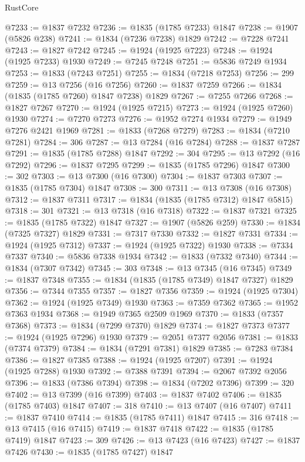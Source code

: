 \begin{lexlean}{RustCore}
\begin{coremodule}
@7233 := @1837 @7232
@7236 := @1835 (@1785 @7233) @1847
@7238 := @1907 (@5826 @238)
@7241 := @1834 (@7236 @7238) @1829
@7242 := @7228 @7241
@7243 := @1827 @7242
@7245 := @1924 (@1925 @7223)
@7248 := @1924 (@1925 @7233) @1930
@7249 := @7245 @7248
@7251 := @5836 @7249 @1934
@7253 := @1833 (@7243 @7251)
@7255 := @1834 (@7218 @7253)
@7256 := 299
@7259 := @13 @7256 (@16 @7256)
@7260 := @1837 @7259
@7266 := @1834 (@1835 (@1785 @7260) @1847 @7238) @1829
@7267 := @7255 @7266
@7268 := @1827 @7267
@7270 := @1924 (@1925 @7215)
@7273 := @1924 (@1925 @7260) @1930
@7274 := @7270 @7273
@7276 := @1952 @7274 @1934
@7279 := @1949 @7276 @2421 @1969
@7281 := @1833 (@7268 @7279)
@7283 := @1834 (@7210 @7281)
@7284 := 306
@7287 := @13 @7284 (@16 @7284)
@7288 := @1837 @7287
@7291 := @1835 (@1785 @7288) @1847
@7292 := 304
@7295 := @13 @7292 (@16 @7292)
@7296 := @1837 @7295
@7299 := @1835 (@1785 @7296) @1847
@7300 := 302
@7303 := @13 @7300 (@16 @7300)
@7304 := @1837 @7303
@7307 := @1835 (@1785 @7304) @1847
@7308 := 300
@7311 := @13 @7308 (@16 @7308)
@7312 := @1837 @7311
@7317 := @1834 (@1835 (@1785 @7312) @1847 @5815)
@7318 := 301
@7321 := @13 @7318 (@16 @7318)
@7322 := @1837 @7321
@7325 := @1835 (@1785 @7322) @1847
@7327 := @1907 (@5826 @259)
@7330 := @1834 (@7325 @7327) @1829
@7331 := @7317 @7330
@7332 := @1827 @7331
@7334 := @1924 (@1925 @7312)
@7337 := @1924 (@1925 @7322) @1930
@7338 := @7334 @7337
@7340 := @5836 @7338 @1934
@7342 := @1833 (@7332 @7340)
@7344 := @1834 (@7307 @7342)
@7345 := 303
@7348 := @13 @7345 (@16 @7345)
@7349 := @1837 @7348
@7355 := @1834 (@1835 (@1785 @7349) @1847 @7327) @1829
@7356 := @7344 @7355
@7357 := @1827 @7356
@7359 := @1924 (@1925 @7304)
@7362 := @1924 (@1925 @7349) @1930
@7363 := @7359 @7362
@7365 := @1952 @7363 @1934
@7368 := @1949 @7365 @2509 @1969
@7370 := @1833 (@7357 @7368)
@7373 := @1834 (@7299 @7370) @1829
@7374 := @1827 @7373
@7377 := @1924 (@1925 @7296) @1930
@7379 := @2051 @7377 @2056
@7381 := @1833 (@7374 @7379)
@7384 := @1834 (@7291 @7381) @1829
@7385 := @7283 @7384
@7386 := @1827 @7385
@7388 := @1924 (@1925 @7207)
@7391 := @1924 (@1925 @7288) @1930
@7392 := @7388 @7391
@7394 := @2067 @7392 @2056
@7396 := @1833 (@7386 @7394)
@7398 := @1834 (@7202 @7396)
@7399 := 320
@7402 := @13 @7399 (@16 @7399)
@7403 := @1837 @7402
@7406 := @1835 (@1785 @7403) @1847
@7407 := 318
@7410 := @13 @7407 (@16 @7407)
@7411 := @1837 @7410
@7414 := @1835 (@1785 @7411) @1847
@7415 := 316
@7418 := @13 @7415 (@16 @7415)
@7419 := @1837 @7418
@7422 := @1835 (@1785 @7419) @1847
@7423 := 309
@7426 := @13 @7423 (@16 @7423)
@7427 := @1837 @7426
@7430 := @1835 (@1785 @7427) @1847

\end{coremodule}
\end{lexlean}
